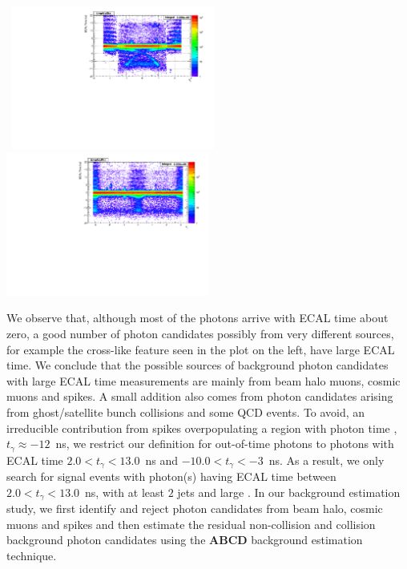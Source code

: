 \vspace{5mm}
\begin{minipage}{0.90\linewidth} 
\begin{center}
\centering
\mbox{
\includegraphics[height=0.4\textwidth, width=0.5\textwidth]{THESISPLOTS/SinglePhotonDataSet-TimeVsEta.pdf}
\includegraphics[height=0.4\textwidth, width=0.5\textwidth]{THESISPLOTS/SinglePhotonDataSet-TimeVsPhi.pdf}}
\label{fig:BKGPLOTS}
\end{center}
\end{minipage}

\vspace{5mm}
 We observe that, although most of the photons arrive with ECAL time about zero, a good number of photon candidates possibly from very different sources, for example the cross-like feature seen in the plot on the left, have large ECAL time. We conclude that the possible sources of background photon candidates with large ECAL time measurements are mainly from beam halo muons, cosmic muons and spikes. A small addition also comes from photon candidates arising from ghost/satellite bunch collisions and some QCD events. To avoid, an irreducible contribution from spikes overpopulating a region with photon time , $t_{\gamma} \approx -12$~ns,  we restrict our definition for out-of-time photons to photons with ECAL time $ 2.0 < t_{\gamma} < 13.0$~ns and $ -10.0 < t_{\gamma} < -3$~ns. As a result, we only search for signal events with photon(s) having ECAL time between $2.0 < t_{\gamma} < 13.0$~ns, with at least $2$ jets and large \ETslash\hspace{0.15cm}.
\newline
 In our background estimation study, we first identify and reject photon candidates from beam halo, cosmic muons and spikes and then estimate the residual non-collision and collision background photon candidates  using the \textbf{\textsf{ABCD}} background estimation technique. 

